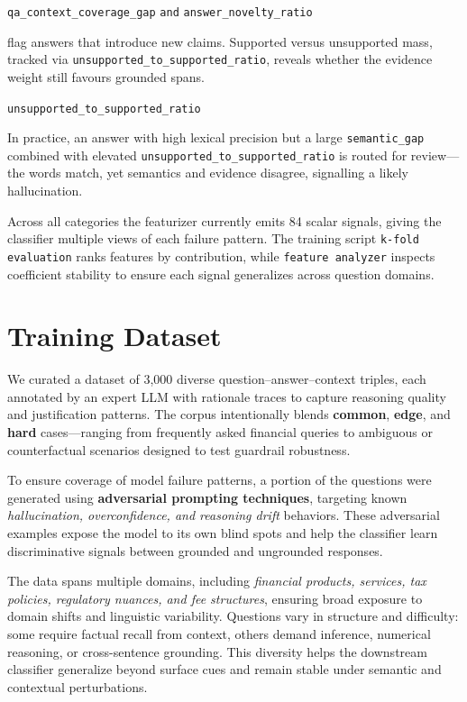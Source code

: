 \documentclass[11pt]{article}
\begin{document}
\begin{itemize}
  \begin{center}
  \texttt{qa\_context\_coverage\_gap} \quad \texttt{and} \quad \texttt{answer\_novelty\_ratio}
  \end{center}
  flag answers that introduce new claims. Supported versus unsupported mass, tracked via \texttt{unsupported\allowbreak\_to\allowbreak\_supported\allowbreak\_ratio}, reveals whether the evidence weight still favours grounded spans.\par\smallskip\centerline{\texttt{unsupported\_to\_supported\_ratio}}\par\smallskip In practice, an answer with high lexical precision but a large \texttt{semantic\_gap} combined with elevated \texttt{unsupported\_to\_supported\_ratio} is routed for review—the words match, yet semantics and evidence disagree, signalling a likely hallucination.
\end{itemize}
Across all categories the featurizer currently emits 84 scalar signals, giving the classifier multiple views of each failure pattern. The training script \texttt{k-fold evaluation} ranks features by contribution, while \texttt{feature analyzer} inspects coefficient stability to ensure each signal generalizes across question domains.

\section{Training Dataset}

We curated a dataset of 3{,}000 diverse question--answer--context triples, each annotated by an expert LLM with rationale traces to capture reasoning quality and justification patterns. The corpus intentionally blends \textbf{common}, \textbf{edge}, and \textbf{hard} cases---ranging from frequently asked financial queries to ambiguous or counterfactual scenarios designed to test guardrail robustness. 

To ensure coverage of model failure patterns, a portion of the questions were generated using \textbf{adversarial prompting techniques}, targeting known \emph{hallucination, overconfidence, and reasoning drift} behaviors. These adversarial examples expose the model to its own blind spots and help the classifier learn discriminative signals between grounded and ungrounded responses.

The data spans multiple domains, including \emph{financial products, services, tax policies, regulatory nuances, and fee structures}, ensuring broad exposure to domain shifts and linguistic variability. Questions vary in structure and difficulty: some require factual recall from context, others demand inference, numerical reasoning, or cross-sentence grounding. This diversity helps the downstream classifier generalize beyond surface cues and remain stable under semantic and contextual perturbations.
\end{document}
